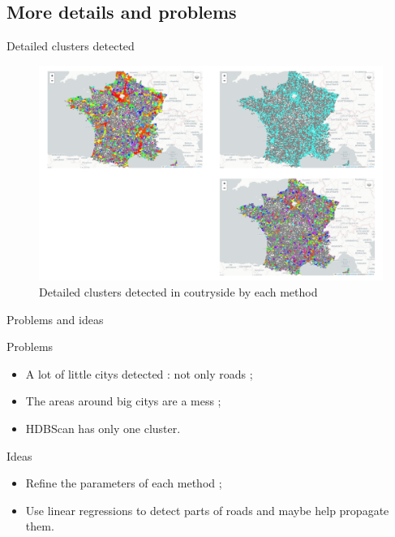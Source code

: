 \subsection{More details and problems}
\insertsubsectionframe

\begin{frame}{Detailed clusters detected}
    \begin{figure}
        \includegraphics[height=0.6\paperheight]{images/clusters_road_detection.html.png}
        \caption{Detailed clusters detected in coutryside by each method}
    \end{figure}
\end{frame}

\begin{frame}{Problems and ideas}
    \begin{block}{Problems}
        \begin{itemize}
            \item A lot of little citys detected : not only roads ;
            \item The areas around big citys are a mess ;
            \item HDBScan has only one cluster.
        \end{itemize}
    \end{block}

    \begin{block}{Ideas}
        \begin{itemize}
            \item Refine the parameters of each method ;
            \item Use linear regressions to detect parts of roads and maybe help propagate them.
        \end{itemize}
    \end{block}
\end{frame}

